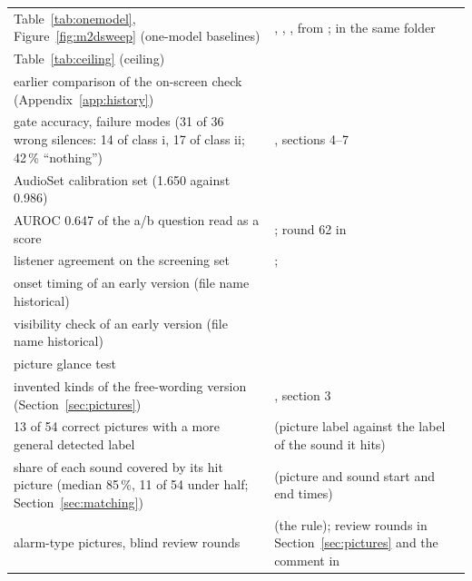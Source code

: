 {\begin{longtable}{L{4.6cm}L{10.2cm}}
Table~\ref{tab:onemodel}, Figure~\ref{fig:m2dsweep} (one-model baselines) & , , , from ;  in the same folder \\
Table~\ref{tab:ceiling} (ceiling) &  \\
earlier comparison of the on-screen check (Appendix~\ref{app:history}) &  \\
gate accuracy, failure modes (31 of 36 wrong silences: 14 of class i, 17 of class ii; 42\,\% ``nothing'') & , sections 4--7 \\
AudioSet calibration set (1.650 against 0.986) &  \\
AUROC 0.647 of the a/b question read as a score & ; round 62 in  \\
listener agreement on the screening set & ;  \\
onset timing of an early version (file name historical) &  \\
visibility check of an early version (file name historical) &  \\
picture glance test &  \\
invented kinds of the free-wording version (Section~\ref{sec:pictures}) & , section 3 \\
13 of 54 correct pictures with a more general detected label &  (picture label against the label of the sound it hits) \\
share of each sound covered by its hit picture (median 85\,\%, 11 of 54 under half; Section~\ref{sec:matching}) &  (picture and sound start and end times) \\
alarm-type pictures, blind review rounds &  (the rule); review rounds in Section~\ref{sec:pictures} and the  comment in  \\

\end{longtable}}

